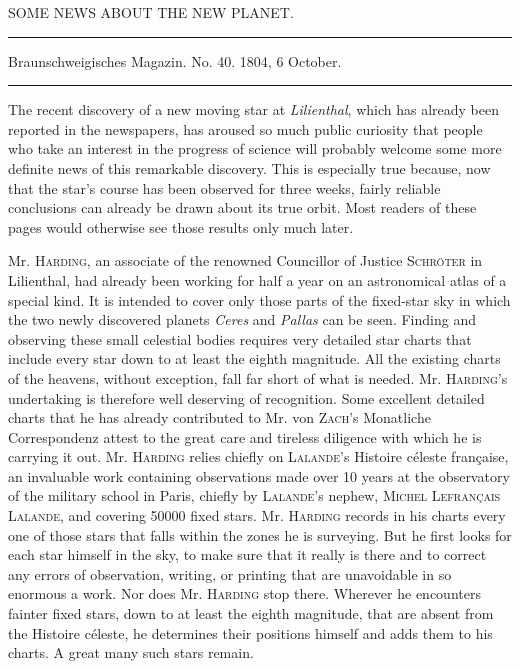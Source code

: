 \clearpage
{}
\hypertarget{native-258-lower}{}
\begin{center}
SOME NEWS ABOUT THE NEW PLANET.

\rule{0.75\linewidth}{0.4pt}

Braunschweigisches Magazin. No. 40. 1804, 6 October.

\rule{0.75\linewidth}{0.4pt}
\end{center}

The recent discovery of a new moving star at \emph{Lilienthal}, which has already been reported in the newspapers, has aroused so much public curiosity that people who take an interest in the progress of science will probably welcome some more definite news of this remarkable discovery. This is especially true because, now that
the star’s course has been observed for three weeks, fairly reliable conclusions can already be drawn about its true orbit. Most readers of these pages would otherwise see those results only much later.

Mr. \textsc{Harding}, an associate of the renowned Councillor of Justice \textsc{Schröter} in Lilienthal, had already been working for half a year on an astronomical atlas of a special kind. It is intended to cover only those parts of the fixed-star sky in which the two newly discovered planets \emph{Ceres} and \emph{Pallas} can be seen. Finding and observing these small celestial bodies requires very detailed star charts that include every star down to at least the eighth magnitude. All the existing charts of the heavens, without exception, fall far short of what is needed. Mr. \textsc{Harding}’s undertaking is therefore well deserving of recognition. Some excellent detailed charts that he has already contributed to Mr. von \textsc{Zach}’s Monatliche Correspondenz attest to the great care and tireless diligence with which he is carrying it out. Mr. \textsc{Harding} relies chiefly on \textsc{Lalande}’s Histoire céleste française, an invaluable work containing observations made over 10 years at the observatory of the military school in Paris, chiefly by \textsc{Lalande}’s nephew, \textsc{Michel Lefrançais Lalande}, and covering 50000 fixed stars. Mr. \textsc{Harding} records in his charts every one of those stars that falls within the zones he is surveying. But he first looks for each star himself in the sky, to make sure that it really is there and to correct any errors of observation, writing, or printing that are unavoidable in so enormous a work. Nor does Mr. \textsc{Harding} stop there. Wherever he encounters fainter fixed stars, down to at least the eighth magnitude, that are absent from the Histoire céleste, he determines their positions himself and adds them to his charts. A great many such stars remain.

